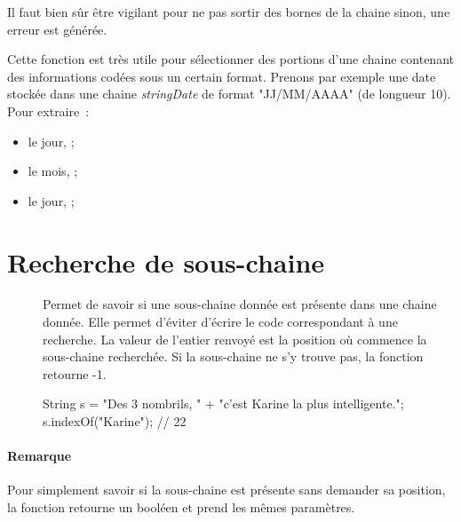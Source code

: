 	Il faut bien sûr être vigilant pour ne pas sortir des bornes de la chaine
	sinon, une erreur est générée. 

	Cette fonction est très utile pour sélectionner des portions d’une chaine
	contenant des informations codées sous un certain format.  Prenons par
	exemple une date stockée dans une chaine \textit{stringDate} de format 
	"JJ/MM/AAAA" (de longueur 10).  Pour extraire~:
	
	\begin{itemize}
		\item le jour, ;
		\item le mois, ;
		\item le jour, ;
	\end{itemize}

	
\section{Recherche de sous-chaine}
	
	\begin{description}
	\item[]	
	
		Permet de savoir si une sous-chaine donnée est présente dans une chaine
		donnée.  Elle permet d’éviter d’écrire le code correspondant à une
		recherche.  La valeur de l’entier renvoyé est la position où commence la
		sous-chaine recherchée.  Si la sous-chaine ne s’y trouve pas, la
		fonction retourne -1.

		\begin{java}
String s = "Des 3 nombrils, " 
	+ "c'est Karine la plus intelligente.";
s.indexOf("Karine"); // 22
		\end{java}

	\end{description}

	\paragraph{Remarque} Pour simplement savoir si la sous-chaine est présente 
	sans demander sa position, la fonction  retourne un booléen et 
	prend les mêmes paramètres. 
	


